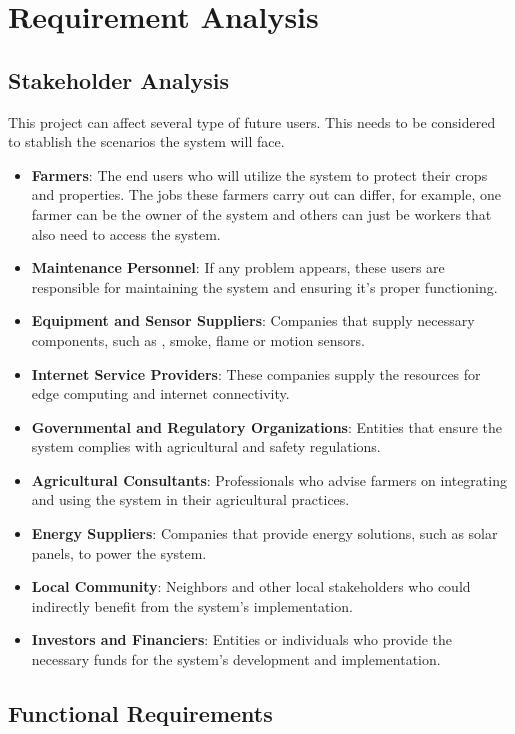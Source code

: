 \section{Requirement Analysis}

\subsection{Stakeholder Analysis}

This project can affect several type of future users. This needs to be considered to stablish the scenarios the system will face. 

\begin{itemize}
    \item \textbf{Farmers}: The end users who will utilize the system to protect their crops and properties. The jobs these farmers carry out can differ, for example, one farmer can be the owner of the system 
    and others can just be workers that also need to access the system.
    \item \textbf{Maintenance Personnel}: If any problem appears, these users are responsible for maintaining the system and ensuring it's proper functioning.
    \item \textbf{Equipment and Sensor Suppliers}: Companies that supply necessary components, such as , smoke, flame or motion sensors.
    \item \textbf{Internet Service Providers}: These companies supply the resources for edge computing and internet connectivity.
    \item \textbf{Governmental and Regulatory Organizations}: Entities that ensure the system complies with agricultural and safety regulations.
    \item \textbf{Agricultural Consultants}: Professionals who advise farmers on integrating and using the system in their agricultural practices.
    \item \textbf{Energy Suppliers}: Companies that provide energy solutions, such as solar panels, to power the system.
    \item \textbf{Local Community}: Neighbors and other local stakeholders who could indirectly benefit from the system's implementation.
    \item \textbf{Investors and Financiers}: Entities or individuals who provide the necessary funds for the system's development and implementation.
\end{itemize}

\subsection{Functional Requirements}


